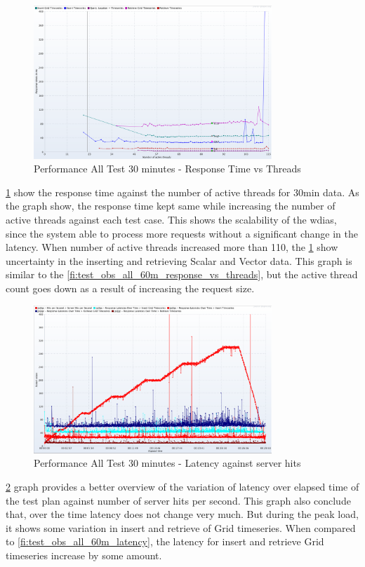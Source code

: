 \begin{figure}[htp]
    \centering
    \includegraphics[width=0.8\textwidth]{results/obs/all/obs_all_30m_response_times_vs_threads.png}
    \caption{Performance All Test 30 minutes - Response Time vs Threads}
    \label{fi:test_obs_all_30m_response_vs_threads}
\end{figure}
\ref{fi:test_obs_all_30m_response_vs_threads} show the response time against the number of active threads for 30min data. As the graph show, the response time kept same while increasing the number of active threads against each test case. This shows the scalability of the \acrshort{wdias}, since the system able to process more requests without a significant change in the latency.
When number of active threads increased more than 110, the \ref{fi:test_obs_all_30m_response_vs_threads} show uncertainty in the inserting and retrieving Scalar and Vector data. This graph is similar to the \ref{fi:test_obs_all_60m_response_vs_threads}, but the active thread count goes down as a result of increasing the request size.

\begin{figure}[htp]
    \centering
    \includegraphics[width=0.8\textwidth]{results/obs/all/obs_all_30m_res_latencies_against_hits.png}
    \caption{Performance All Test 30 minutes - Latency against server hits}
    \label{fi:test_obs_all_30m_latency}
\end{figure}
\ref{fi:test_obs_all_30m_latency} graph provides a better overview of the variation of latency over elapsed time of the test plan against number of server hits per second.
This graph also conclude that, over the time latency does not change very much. But during the peak load, it shows some variation in insert and retrieve of Grid timeseries.
When compared to \ref{fi:test_obs_all_60m_latency}, the latency for insert and retrieve Grid timeseries increase by some amount.



